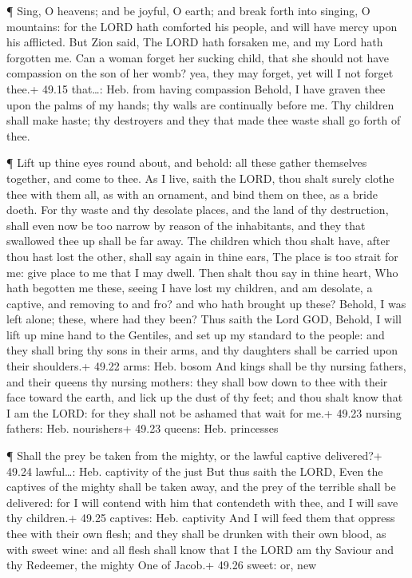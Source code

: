  ¶ Sing, O heavens; and be joyful, O earth; and break forth
into singing, O mountains: for the LORD hath comforted his people, and
will have mercy upon his afflicted.  But Zion said, The
LORD hath forsaken me, and my Lord hath forgotten me.  Can
a woman forget her sucking child, that she should not have compassion on
the son of her womb? yea, they may forget, yet will I not forget thee.+
49.15 that\ldots: Heb. from having compassion  Behold, I
have graven thee upon the palms of my hands; thy walls are continually
before me.  Thy children shall make haste; thy destroyers
and they that made thee waste shall go forth of thee.

 ¶ Lift up thine eyes round about, and behold: all these
gather themselves together, and come to thee. As I live, saith the LORD,
thou shalt surely clothe thee with them all, as with an ornament, and
bind them on thee, as a bride doeth.  For thy waste and thy
desolate places, and the land of thy destruction, shall even now be too
narrow by reason of the inhabitants, and they that swallowed thee up
shall be far away.  The children which thou shalt have,
after thou hast lost the other, shall say again in thine ears, The place
is too strait for me: give place to me that I may dwell. 
Then shalt thou say in thine heart, Who hath begotten me these, seeing I
have lost my children, and am desolate, a captive, and removing to and
fro? and who hath brought up these? Behold, I was left alone; these,
where had they been?  Thus saith the Lord GOD, Behold, I
will lift up mine hand to the Gentiles, and set up my standard to the
people: and they shall bring thy sons in their arms, and thy daughters
shall be carried upon their shoulders.+ 49.22 arms: Heb. bosom
 And kings shall be thy nursing fathers, and their queens
thy nursing mothers: they shall bow down to thee with their face toward
the earth, and lick up the dust of thy feet; and thou shalt know that I
am the LORD: for they shall not be ashamed that wait for me.+ 49.23
nursing fathers: Heb. nourishers+ 49.23 queens: Heb. princesses

 ¶ Shall the prey be taken from the mighty, or the lawful
captive delivered?+ 49.24 lawful\ldots: Heb. captivity of the just
 But thus saith the LORD, Even the captives of the mighty
shall be taken away, and the prey of the terrible shall be delivered:
for I will contend with him that contendeth with thee, and I will save
thy children.+ 49.25 captives: Heb. captivity  And I will
feed them that oppress thee with their own flesh; and they shall be
drunken with their own blood, as with sweet wine: and all flesh shall
know that I the LORD am thy Saviour and thy Redeemer, the mighty One of
Jacob.+ 49.26 sweet: or, new


